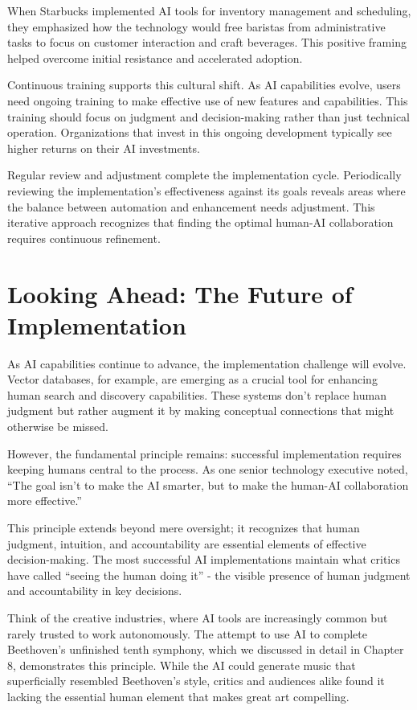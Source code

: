 \documentclass[
  Letterpaper,
]{scrbook}
\begin{document}
When Starbucks implemented AI tools for
inventory management and scheduling, they emphasized how the technology
would free baristas from administrative tasks to focus on customer
interaction and craft beverages. This positive framing helped overcome
initial resistance and accelerated adoption.

Continuous training supports this cultural shift. As AI capabilities
evolve, users need ongoing training to make effective use of new
features and capabilities. This training should focus on judgment and
decision-making rather than just technical operation. Organizations that
invest in this ongoing development typically see higher returns on their
AI investments.

Regular review and adjustment complete the implementation cycle.
Periodically reviewing the implementation's effectiveness against its
goals reveals areas where the balance between automation and enhancement
needs adjustment. This iterative approach recognizes that finding the
optimal human-AI collaboration requires continuous refinement.

\section{Looking Ahead: The Future of
Implementation}\label{looking-ahead-the-future-of-implementation}

As AI capabilities continue to advance, the implementation challenge
will evolve. Vector databases, for
example, are emerging as a crucial tool for enhancing human search and
discovery capabilities. These systems don't replace human judgment but
rather augment it by making conceptual connections that might otherwise
be missed.

However, the fundamental principle remains: successful implementation
requires keeping humans central to the process. As one senior technology
executive noted, ``The goal isn't to make the AI smarter, but to make
the human-AI collaboration more effective.''

This principle extends beyond mere oversight; it recognizes that human
judgment, intuition, and accountability are essential elements of
effective decision-making. The most successful AI implementations
maintain what critics have called ``seeing the human doing it'' - the
visible presence of human judgment and accountability in key decisions.

Think of the creative industries, where AI
tools are increasingly common but rarely trusted to work autonomously.
The attempt to use AI to complete Beethoven's
unfinished tenth symphony, which we discussed in detail in Chapter 8,
demonstrates this principle. While the AI could generate music that
superficially resembled Beethoven's style, critics and audiences alike
found it lacking the essential human element that makes great art
compelling.
\end{document}
